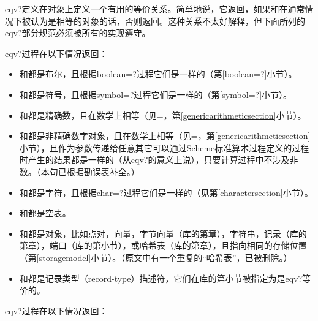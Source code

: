 \begin{entry}{%
}

{\cf eqv?}定义在对象上定义一个有用的等价关系。简单地说，它返回\schtrue{}，如果和在通常情况下被认为是相等的对象的话，否则返回\schfalse{}。这种关系不太好解释，但下面所列的{\cf eqv?}部分规范必须被所有的实现遵守。

{\cf eqv?}过程在以下情况返回\schtrue{}：

\begin{itemize}
\item {}和都是布尔，且根据{\cf boolean=?}过程它们是一样的（第\ref{boolean=?}小节）。

\item {}和都是符号，且根据{\cf symbol=?}过程它们是一样的（第\ref{symbol=?}小节）。

\item {}和都是精确数，且在数学上相等（见{\cf =}，第\ref{genericarithmeticsection}小节）。

\item {}和都是非精确数字对象，且在数学上相等（见{\cf =}，第\ref{genericarithmeticsection}小节），且作为参数传递给任意其它可以通过Scheme标准算术过程定义的过程时产生的结果都是一样的（从{\cf eqv?}的意义上说），只要计算过程中不涉及非数。（本句已根据勘误表补全。）

\item {}和都是字符，且根据{\cf char=?}过程它们是一样的（见第\ref{charactersection}小节）。

\item {}和都是空表。

\item {}和都是对象，比如点对，向量，字节向量（库的第章），字符串，记录（库的第章），端口（库的第小节），或哈希表（库的第章），且指向相同的存储位置（第\ref{storagemodel}小节）。（原文中有一个重复的“哈希表”，已被删除。）

\item {}和都是记录类型（record-type）描述符，它们在库的第小节被指定为是{\cf eqv?}等价的。
\end{itemize}

{\cf eqv?}过程在以下情况返回\schfalse{}：


\end{entry}
